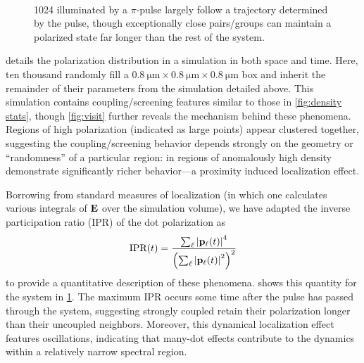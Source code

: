 \begin{figure}
  \centering
   \\
  \caption{\label{fig:polarization vis}
    1024 \qds{} illuminated by a $\pi$-pulse largely follow a trajectory determined by the pulse, though exceptionally close pairs/groups can maintain a polarized state far longer than the rest of the system.
  }
\end{figure}

 details the polarization distribution in a simulation in both space and time.
Here, ten thousand \qds{} randomly fill a $\SI{0.8}{\micro\meter} \times \SI{0.8}{\micro\meter} \times \SI{0.8}{\micro\meter}$ box and inherit the remainder of their parameters from the simulation detailed above.
This simulation contains coupling/screening features similar to those in \cref{fig:density stats},
though \cref{fig:visit} further reveals the mechanism behind these phenomena.
Regions of high polarization (indicated as large points) appear clustered together, suggesting the coupling/screening behavior depends strongly on the geometry or ``randomness'' of a particular region: \qds{} in regions of anomalously high density demonstrate significantly richer behavior---a proximity induced localization effect.

Borrowing from standard measures of localization (in which one calculates various integrals of $\vb{E}$ over the simulation volume), we have adapted the inverse participation ratio (IPR)  of the dot polarization as
\begin{equation}
  \text{IPR}(t) = \frac{\sum_\ell \abs{\vb{p}_\ell(t)}^4}{\qty(\sum_\ell \abs{\vb{p}_\ell(t)}^2)^2}
  \label{eq:ipr}
\end{equation}
to provide a quantitative description of these phenomena.
 shows this quantity for the system in \cref{fig:polarization vis}.
The maximum IPR occurs some time after the pulse has passed through the system, suggesting strongly coupled \qds{} retain their polarization longer than their uncoupled neighbors. Moreover, this dynamical localization effect features oscillations, indicating that many-dot effects contribute to the dynamics within a relatively narrow spectral region.

